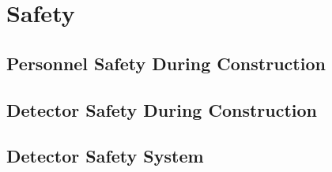 \section{Safety}
\label{sec:fdsp-tpcelec-safety}

\subsection{Personnel Safety During Construction}
\label{sec:fdsp-tpcelec-safety-personnel}

\subsection{Detector Safety During Construction}
\label{sec:fdsp-tpcelec-safety-detcon}

\subsection{Detector Safety System}
\label{sec:fdsp-tpcelec-safety-detsyst}
